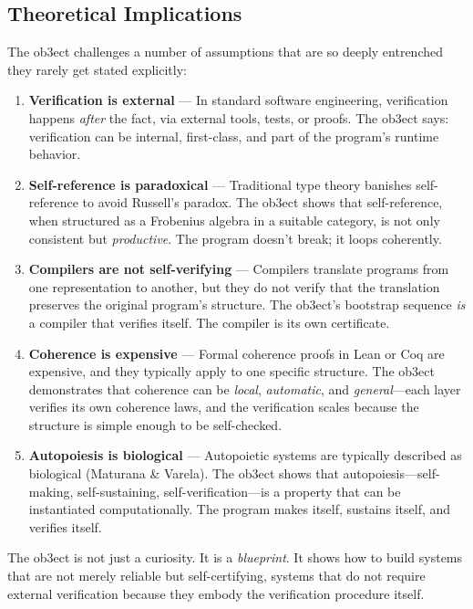 \documentclass[12pt,a4paper]{article}
\begin{document}
\subsection{Theoretical Implications}

The ob3ect challenges a number of assumptions that are so deeply entrenched they rarely get stated explicitly:

\begin{enumerate}
    \item \textbf{Verification is external} --- In standard software engineering, verification happens \emph{after} the fact, via external tools, tests, or proofs. The ob3ect says: verification can be internal, first-class, and part of the program's runtime behavior.
    \item \textbf{Self-reference is paradoxical} --- Traditional type theory banishes self-reference to avoid Russell's paradox. The ob3ect shows that self-reference, when structured as a Frobenius algebra in a suitable category, is not only consistent but \emph{productive}. The program doesn't break; it loops coherently.
    \item \textbf{Compilers are not self-verifying} --- Compilers translate programs from one representation to another, but they do not verify that the translation preserves the original program's structure. The ob3ect's bootstrap sequence \emph{is} a compiler that verifies itself. The compiler is its own certificate.
    \item \textbf{Coherence is expensive} --- Formal coherence proofs in Lean or Coq are expensive, and they typically apply to one specific structure. The ob3ect demonstrates that coherence can be \emph{local}, \emph{automatic}, and \emph{general}---each layer verifies its own coherence laws, and the verification scales because the structure is simple enough to be self-checked.
    \item \textbf{Autopoiesis is biological} --- Autopoietic systems are typically described as biological (Maturana \& Varela). The ob3ect shows that autopoiesis---self-making, self-sustaining, self-verification---is a property that can be instantiated computationally. The program makes itself, sustains itself, and verifies itself.
\end{enumerate}

The ob3ect is not just a curiosity. It is a \emph{blueprint}. It shows how to build systems that are not merely reliable but self-certifying, systems that do not require external verification because they embody the verification procedure itself.
\end{document}

